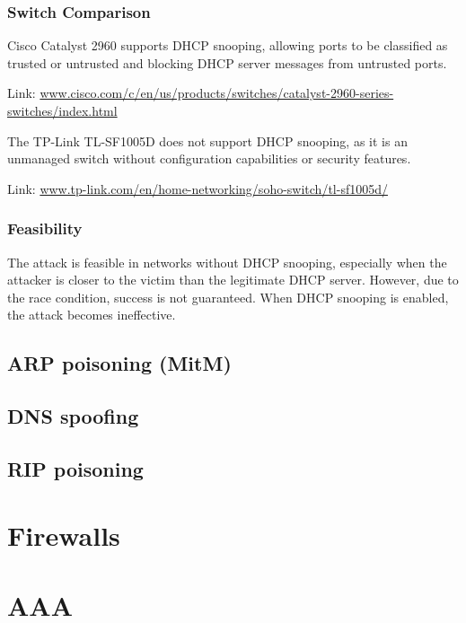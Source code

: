 \documentclass[12pt]{article}
\begin{document}
\subsubsection{Switch Comparison}  
Cisco Catalyst 2960 supports DHCP snooping, allowing ports to be classified as trusted or untrusted and blocking DHCP server messages from untrusted ports.

Link: \url{www.cisco.com/c/en/us/products/switches/catalyst-2960-series-switches/index.html}

\vspace{0.3cm}

The TP-Link TL-SF1005D does not support DHCP snooping, as it is an unmanaged switch without configuration capabilities or security features.

Link: \url{www.tp-link.com/en/home-networking/soho-switch/tl-sf1005d/}

\subsubsection{Feasibility}  
The attack is feasible in networks without DHCP snooping, especially when the attacker is closer to the victim than the legitimate DHCP server. However, due to the race condition, success is not guaranteed. When DHCP snooping is enabled, the attack becomes ineffective.

\subsection{ARP poisoning (MitM)}

\subsection{DNS spoofing}

\subsection{RIP poisoning}




\newpage

\section {Firewalls}

\newpage

\section {AAA}
\end{document}
